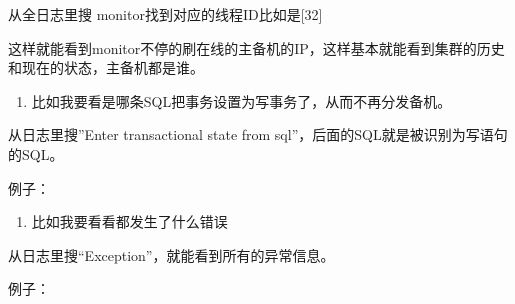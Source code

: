 \documentclass[letterpaper,10pt,english]{sphinxmanual}
\begin{document}
从全日志里搜  monitor找到对应的线程ID比如是{[}32{]}

\begin{sphinxVerbatim}[commandchars=\\\{\}]
 \PYG{l+s+s2}{[32}\PYG{l+s+s2}{]}   
\end{sphinxVerbatim}

这样就能看到monitor不停的刷在线的主备机的IP，这样基本就能看到集群的历史和现在的状态，主备机都是谁。
\begin{enumerate}
%
\setcounter{enumi}{3}
\item {} 
比如我要看是哪条SQL把事务设置为写事务了，从而不再分发备机。

\end{enumerate}

从日志里搜”Enter transactional state from sql”，后面的SQL就是被识别为写语句的SQL。

例子：

\begin{sphinxVerbatim}[commandchars=\\\{\}]
\PYG{p}{[} \PYG{p}{]} \PYG{p}{[}\PYG{p}{]} \PYG{p}{[}\PYG{p}{]}     \PYG{p}{[}    \PYG{p}{]}
\end{sphinxVerbatim}
\begin{enumerate}
%
\setcounter{enumi}{4}
\item {} 
比如我要看看都发生了什么错误

\end{enumerate}

从日志里搜“Exception”，就能看到所有的异常信息。

例子：
\end{document}
